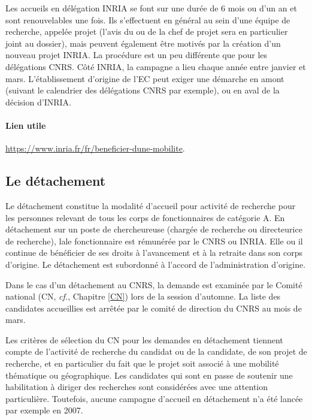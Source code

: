 
Les accueils en d\'el\'egation INRIA se font sur une dur\'ee de 6 mois ou
d'un an et sont renouvelables une fois. Ils s'effectuent en
g\'en\'eral au sein d'une \'equipe de recherche, appel\'ee projet
(l'avis du ou de la chef de projet sera en particulier joint au dossier),
mais peuvent \'egalement \^etre motiv\'es par la cr\'eation d'un
nouveau projet INRIA. La proc\'edure est un peu diff\'erente que
pour les d\'el\'egations CNRS. C\^ot\'e INRIA, la campagne a lieu chaque ann\'ee entre janvier et mars.
L'\'etablissement d'origine de l'EC peut exiger une d\'emarche en amont (suivant le calendrier des d\'el\'egations CNRS par exemple), 
ou en aval de la d\'ecision d'INRIA.

\vspace{-.5\baselineskip}
\paragraph*{Lien utile}\url{https://www.inria.fr/fr/beneficier-dune-mobilite}.

\subsection{Le d\'etachement}
\label{detachement}


Le d\'etachement constitue la modalit\'e d'accueil pour activit\'e
de recherche pour les personnes relevant de tous les corps de
fonctionnaires de cat\'egorie A. En d\'etachement sur un poste de
chercheur\mp euse (charg\'e\mp e de recherche ou directeur\mp ice de recherche), la\mp le
fonctionnaire est r\'emun\'er\'e\mp e par le CNRS ou INRIA. Elle ou il continue
de b\'en\'eficier de ses droits \`a l'avancement et \`a la retraite
dans son corps d'origine. Le d\'etachement est subordonn\'e \`a
l'accord de l'administration d'origine.

Dans le cas d'un d\'etachement au CNRS, la demande est examin\'ee
par le Comit\'e national (CN, {\em cf.}, Chapitre \ref{CN}) lors de la session
d'automne. La liste des candidat\mp e\mp s accueilli\mp e\mp s est arr\^et\'ee par le
comit\'e de direction du CNRS au mois de mars.

Les crit\`eres de s\'election du CN pour les demandes en
d\'etachement tiennent compte de l'activit\'e de recherche du
candidat ou de la candidate, de son projet de recherche, et en particulier du fait que
le projet soit associ\'e \`a une mobilit\'e th\'ematique ou
g\'eographique. Les candidat\mp e\mp s qui sont en passe de soutenir une
habilitation \`a diriger des recherches sont consid\'er\'e\mp e\mp s avec une
attention particuli\`ere. Toutefois, aucune campagne d'accueil en
d\'etachement n'a \'et\'e lanc\'ee par exemple en 2007.

